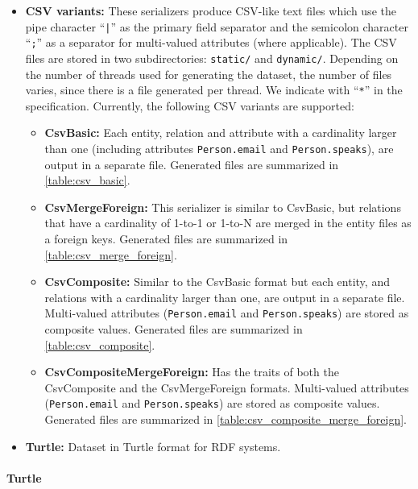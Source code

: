 \begin{itemize}
  \item \textbf{CSV variants:}
      These serializers produce CSV-like text files which use the pipe character ``\texttt{|}'' as the primary field separator and the semicolon character ``\texttt{;}'' as a separator for multi-valued attributes (where applicable).
      The CSV files are stored in two subdirectories: \texttt{static/} and \texttt{dynamic/}.
      Depending on the number of threads used for generating the dataset, the number of files varies, since there is a file generated per thread. We indicate with ``\texttt{*}'' in the specification.
      Currently, the following CSV variants are supported:
    \begin{itemize}
      \item \textbf{CsvBasic:}
      Each entity, relation and attribute with a cardinality larger than one (including attributes \texttt{Person.email} and \texttt{Person.speaks}), are output in a separate file.
      Generated files are summarized in \autoref{table:csv_basic}.

      \item \textbf{CsvMergeForeign:}
      This serializer is similar to CsvBasic, but relations that have a cardinality of 1-to-1 or 1-to-N are merged in the entity files as a foreign keys.
      Generated files are summarized in \autoref{table:csv_merge_foreign}.

      \item \textbf{CsvComposite:}
      Similar to the CsvBasic format but each entity, and relations with a cardinality larger than one, are output in a separate file.
      Multi-valued attributes (\texttt{Person.email} and \texttt{Person.speaks}) are stored as composite values.
      Generated files are summarized in \autoref{table:csv_composite}.

      \item \textbf{CsvCompositeMergeForeign:}
      Has the traits of both the CsvComposite and the CsvMergeForeign formats.
      Multi-valued attributes (\texttt{Person.email} and \texttt{Person.speaks}) are stored as composite values.
      Generated files are summarized in \autoref{table:csv_composite_merge_foreign}.
    \end{itemize}
  \item \textbf{Turtle:} Dataset in Turtle format for RDF systems.
\end{itemize}

\paragraph{Turtle}

